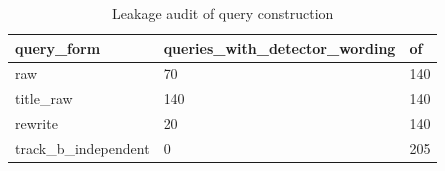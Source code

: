 \begin{table}[t]\centering\caption{Leakage audit of query construction}
\begin{tabular}{lll}\hline
query\_form & queries\_with\_detector\_wording & of \\\hline
raw & 70 & 140 \\
title\_raw & 140 & 140 \\
rewrite & 20 & 140 \\
track\_b\_independent & 0 & 205 \\
\hline\end{tabular}\end{table}
